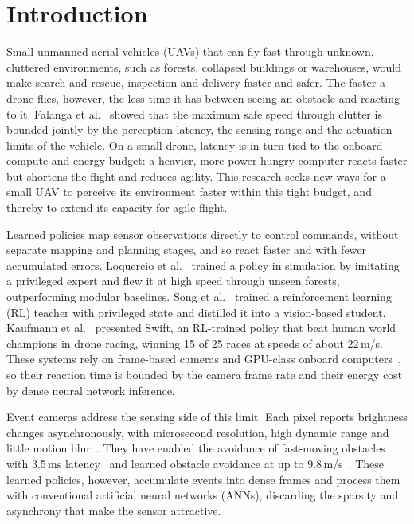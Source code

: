 \section{Introduction}
Small unmanned aerial vehicles (UAVs) that can fly fast through unknown, cluttered environments, such as forests, collapsed buildings or warehouses, would make search and rescue, inspection and delivery faster and safer. The faster a drone flies, however, the less time it has between seeing an obstacle and reacting to it. Falanga et al.~\cite{falangaHowFastToo2019} showed that the maximum safe speed through clutter is bounded jointly by the perception latency, the sensing range and the actuation limits of the vehicle. On a small drone, latency is in turn tied to the onboard compute and energy budget: a heavier, more power-hungry computer reacts faster but shortens the flight and reduces agility. This research seeks new ways for a small UAV to perceive its environment faster within this tight budget, and thereby to extend its capacity for agile flight.

Learned policies map sensor observations directly to control commands, without separate mapping and planning stages, and so react faster and with fewer accumulated errors. Loquercio et al.~\cite{loquercioLearningHighSpeedFlight2021} trained a policy in simulation by imitating a privileged expert and flew it at high speed through unseen forests, outperforming modular baselines. Song et al.~\cite{songLearningPerceptionAwareAgile2023} trained a reinforcement learning (RL) teacher with privileged state and distilled it into a vision-based student. Kaufmann et al.~\cite{kaufmannChampionlevelDroneRacing2023} presented Swift, an RL-trained policy that beat human world champions in drone racing, winning 15 of 25 races at speeds of about 22\,m/s. These systems rely on frame-based cameras and GPU-class onboard computers~\cite{foehnAgiliciousOpensourceOpenhardware2022}, so their reaction time is bounded by the camera frame rate and their energy cost by dense neural network inference.

Event cameras address the sensing side of this limit. Each pixel reports brightness changes asynchronously, with microsecond resolution, high dynamic range and little motion blur~\cite{gallegoEventbasedVisionSurvey2022}. They have enabled the avoidance of fast-moving obstacles with 3.5\,ms latency~\cite{falangaDynamicObstacleAvoidance2020} and learned obstacle avoidance at up to 9.8\,m/s~\cite{bhattacharyaMonocularEventBasedVision2024,messikommerApproximateImitationLearning}. These learned policies, however, accumulate events into dense frames and process them with conventional artificial neural networks (ANNs), discarding the sparsity and asynchrony that make the sensor attractive.

